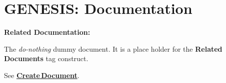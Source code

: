 \documentclass[12pt]{article}
\begin{document}
\section*{GENESIS: Documentation}

{\bf Related Documentation:}

\noindent The {\it do-nothing} dummy document. It is a place holder for the {\bf Related\,Documents} tag construct.

See \href{../document-create/document-create.tex}{\bf Create\,Document}.
\end{document}
